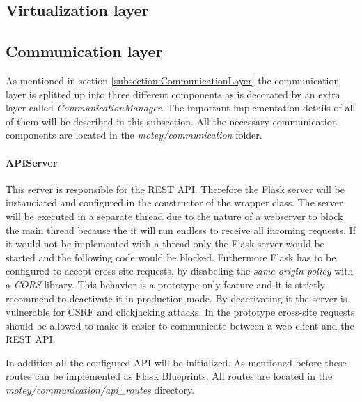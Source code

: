 \subsection{Virtualization layer}
\doit

\subsection{Communication layer}
\label{subsection:implementation-communication-layer}
As mentioned in section \ref{subsection:CommunicationLayer} the communication layer is splitted up into three different components as is decorated by an extra layer called \textit{CommunicationManager}.
The important implementation details of all of them will be described in this subsection.
All the necessary communication components are located in the \textit{motey/communication} folder.

\paragraph{APIServer} This server is responsible for the \ac{REST} \ac{API}.
Therefore the Flask server will be instanciated and configured in the constructor of the wrapper class.
The server will be executed in a separate thread due to the nature of a webserver to block the main thread because the it will run endless to receive all incoming requests.
If it would not be implemented with a thread only the Flask server would be started and the following code would be blocked.
Futhermore Flask has to be configured to accept cross-site requests, by disabeling the \textit{same origin policy} with a \textit{\ac{CORS}} library.
This behavior is a prototype only feature and it is strictly recommend to deactivate it in production mode.
By deactivating it the server is vulnerable for \ac{CSRF} and clickjacking attacks.
In the prototype cross-site requests should be allowed to make it easier to communicate between a web client and the \ac{REST} \ac{API}.

In addition all the configured \ac{API} will be initialized.
As mentioned before these routes can be implemented as Flask Blueprints.
All routes are located in the \textit{motey/communication/api\_routes} directory.

